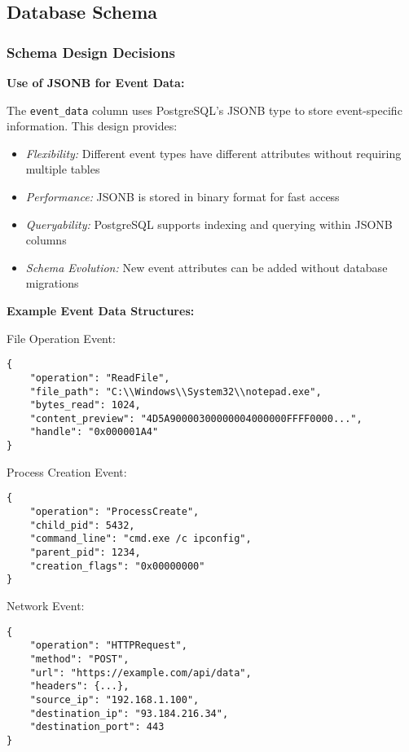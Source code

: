 \subsection{Database Schema}

\subsubsection{Schema Design Decisions}

\textbf{Use of JSONB for Event Data:}

The \texttt{event\_data} column uses PostgreSQL's JSONB type to store event-specific information. This design provides:

\begin{itemize}
    \item \textit{Flexibility:} Different event types have different attributes without requiring multiple tables
    \item \textit{Performance:} JSONB is stored in binary format for fast access
    \item \textit{Queryability:} PostgreSQL supports indexing and querying within JSONB columns
    \item \textit{Schema Evolution:} New event attributes can be added without database migrations
\end{itemize}

\textbf{Example Event Data Structures:}

File Operation Event:
\begin{verbatim}
{
    "operation": "ReadFile",
    "file_path": "C:\\Windows\\System32\\notepad.exe",
    "bytes_read": 1024,
    "content_preview": "4D5A90000300000004000000FFFF0000...",
    "handle": "0x000001A4"
}
\end{verbatim}

Process Creation Event:
\begin{verbatim}
{
    "operation": "ProcessCreate",
    "child_pid": 5432,
    "command_line": "cmd.exe /c ipconfig",
    "parent_pid": 1234,
    "creation_flags": "0x00000000"
}
\end{verbatim}

Network Event:
\begin{verbatim}
{
    "operation": "HTTPRequest",
    "method": "POST",
    "url": "https://example.com/api/data",
    "headers": {...},
    "source_ip": "192.168.1.100",
    "destination_ip": "93.184.216.34",
    "destination_port": 443
}
\end{verbatim}

